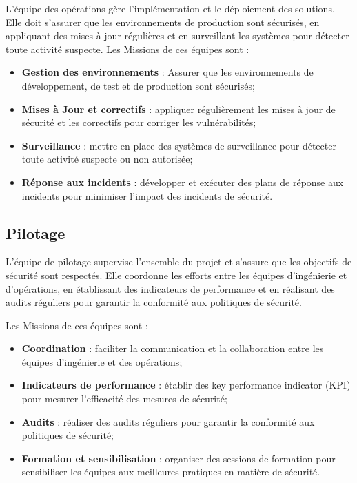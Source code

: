 L'équipe des opérations gère l'implémentation et le déploiement des solutions. Elle doit s'assurer que les environnements de production sont sécurisés, en appliquant des mises à jour régulières et en surveillant les systèmes pour détecter toute activité suspecte.
Les Missions de ces équipes sont :
\begin{itemize}
    \item \textbf{Gestion des environnements} : Assurer que les environnements de développement, de test et de production sont sécurisés;
    \item \textbf{Mises à Jour et correctifs} : appliquer régulièrement les mises à jour de sécurité et les correctifs pour corriger les vulnérabilités;
    \item \textbf{Surveillance} : mettre en place des systèmes de surveillance pour détecter toute activité suspecte ou non autorisée;
    \item \textbf{Réponse aux incidents} : développer et exécuter des plans de réponse aux incidents pour minimiser l'impact des incidents de sécurité.
\end{itemize}

\subsection{Pilotage}

L'équipe de pilotage supervise l'ensemble du projet et s'assure que les objectifs de sécurité sont respectés. Elle coordonne les efforts entre les équipes d'ingénierie et d'opérations, en établissant des indicateurs de performance et en réalisant des audits réguliers pour garantir la conformité aux politiques de sécurité.

Les Missions de ces équipes sont :
\begin{itemize}
    \item \textbf{Coordination} : faciliter la communication et la collaboration entre les équipes d'ingénierie et des opérations;
    \item \textbf{Indicateurs de performance} : établir des key performance indicator (KPI) pour mesurer l'efficacité des mesures de sécurité;
    \item \textbf{Audits} : réaliser des audits réguliers pour garantir la conformité aux politiques de sécurité;
    \item \textbf{Formation et sensibilisation} : organiser des sessions de formation pour sensibiliser les équipes aux meilleures pratiques en matière de sécurité.
\end{itemize}

